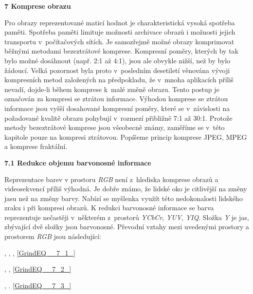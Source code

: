 \noindent 

\noindent 

\noindent 

\noindent 

\noindent 

\noindent 


\noindent \textbf{7  Komprese obrazu}

\noindent Pro obrazy reprezentované maticí hodnot je charakteristická vysoká spotřeba paměti. Spotřeba paměti limituje možnosti archivace obrazů i možnosti jejich transportu v~počítačových sítích. Je samozřejmě možné obrazy komprimovat běžnými metodami bezeztrátové komprese. Kompresní poměry, kterých by tak bylo možné dosáhnout (např. 2:1 až 4:1), jsou ale obvykle nižší, než by bylo žádoucí. Velká pozornost byla proto v~posledním desetiletí věnována vývoji kompresních metod založených na předpokladu, že v~mnoha aplikacích příliš nevadí, dojde-li během komprese k~malé změně obrazu. Tento postup je označován za kompresi se ztrátou informace. Výhodou komprese se ztrátou informace jsou vyšší dosahované kompresní poměry, které se v~závislosti na požadované kvalitě obrazu pohybují v~rozmezí přibližně 7:1 až 30:1. Protože metody bezeztrátové komprese jsou všeobecně známy, zaměříme se v~této kapitole pouze na kompresi ztrátovou. Popíšeme princip komprese JPEG, MPEG a komprese fraktální.

\noindent \textbf{7.1  Redukce objemu barvonosné informace}

\noindent Reprezentace barev v prostoru \textit{RGB} není z~hlediska komprese obrazů a videosekvencí příliš výhodná. Je dobře známo, že lidské oko je citlivější na změny jasu než na změny barvy. Nabízí se myšlenka využít této nedokonalosti lidského zraku i při kompresi obrazů. K redukci barvonosné informace se barva reprezentuje nečastěji v~některém z~prostorů \textit{YCbCr}, \textit{YUV}, \textit{YIQ}. Složka \textit{Y} je jas, zbývající dvě složky jsou barvonosné. Převodní vztahy mezi uvedenými prostory a prostorem \textit{RGB} jsou následující:

 ,   ,   , \eqref{GrindEQ__7_1_}

 ,   , \eqref{GrindEQ__7_2_}

 ,   . \eqref{GrindEQ__7_3_}

